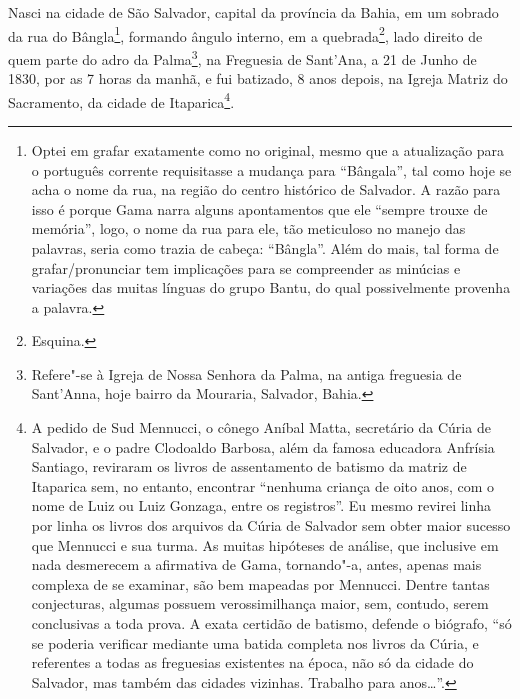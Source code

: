 Nasci na cidade de São Salvador, capital da província da Bahia, em um
sobrado da rua do Bângla\footnote{Optei em grafar exatamente como no
  original, mesmo que a atualização para o português corrente
  requisitasse a mudança para ``Bângala'', tal como hoje se acha o nome da
  rua, na região do centro histórico de Salvador. A razão para isso é
  porque Gama narra alguns apontamentos que ele ``sempre trouxe de
  memória'', logo, o nome da rua para ele, tão meticuloso no manejo das
  palavras, seria como trazia de cabeça: ``Bângla''. Além do mais, tal
  forma de grafar/pronunciar tem implicações para se compreender as
  minúcias e variações das muitas línguas do grupo Bantu, do qual
  possivelmente provenha a palavra.}, formando ângulo interno, em a
quebrada\footnote{Esquina.}, lado direito de quem parte do adro da
Palma\footnote{Refere"-se à Igreja de Nossa Senhora da Palma, na antiga
  freguesia de Sant'Anna, hoje bairro da Mouraria, Salvador, Bahia.}, na
Freguesia de Sant'Ana, a 21 de Junho de 1830, por as 7 horas da manhã, e
fui batizado, 8 anos depois, na Igreja Matriz do Sacramento, da cidade
de Itaparica\footnote{A pedido de Sud Mennucci, o cônego Aníbal Matta,
  secretário da Cúria de Salvador, e o padre Clodoaldo Barbosa, além da
  famosa educadora Anfrísia Santiago, reviraram os livros de
  assentamento de batismo da matriz de Itaparica sem, no entanto,
  encontrar ``nenhuma criança de oito anos, com o nome de Luiz ou Luiz
  Gonzaga, entre os registros''. Eu mesmo revirei linha por linha os
  livros dos arquivos da Cúria de Salvador sem obter maior sucesso que
  Mennucci e sua turma. As muitas hipóteses de análise, que inclusive em
  nada desmerecem a afirmativa de Gama, tornando"-a, antes, apenas mais
  complexa de se examinar, são bem mapeadas por Mennucci. Dentre tantas
  conjecturas, algumas possuem verossimilhança maior, sem, contudo,
  serem conclusivas a toda prova. A exata certidão de batismo, defende o
  biógrafo, ``só se poderia verificar mediante uma batida completa nos
  livros da Cúria, e referentes a todas as freguesias existentes na
  época, não só da cidade do Salvador, mas também das cidades vizinhas.
  Trabalho para anos\ldots{}''.}.

